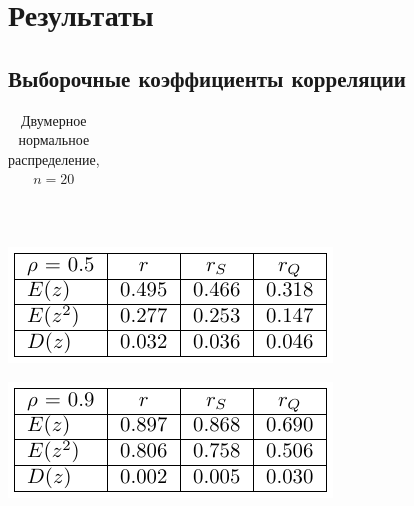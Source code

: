 \documentclass[a4paper]{article}
\begin{document}
\section{Результаты}
\subsection{Выборочные коэффициенты корреляции}
\begin{table}[H]
    \centering
    \begin{tabular}{|l|c|c|c|}
    \hline 
    
    \end{tabular}\\
    \begin{center}
        \includegraphics[]{LabSrcs/resources/20rho0.5.pdf}
    \end{center}
    \begin{center}
        \includegraphics{LabSrcs/resources/20rho0.9.pdf}
    \end{center}
    \caption{Двумерное нормальное распределение, $n=20$}
    \label{tab:norm20}
\end{table}
\end{document}
